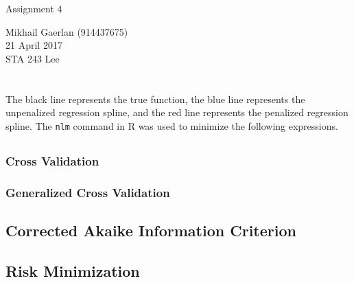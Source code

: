 \documentclass[11pt]{article}
\begin{document}
\begin{multicols}{2}
  \phantom{hello}\vspace{0.01\baselineskip}
  \phantom{hello}\vspace{0.01\baselineskip}
  {\large Assignment 4}\\
  \begin{flushright}
    Mikhail Gaerlan (914437675)\\
    21 April 2017\\
    STA 243 Lee
  \end{flushright}
\end{multicols}
\vspace{-2.3\baselineskip}

\hrulefill

\section{}

The black line represents the true function, the blue line represents the unpenalized regression spline, and the red line represents the penalized regression spline. The \texttt{nlm} command in R was used to minimize the following expressions.

\subsection{}

\subsubsection{Cross Validation}

\subsubsection{Generalized Cross Validation}

\subsection{Corrected Akaike Information Criterion}

\subsection{Risk Minimization}
\end{document}
